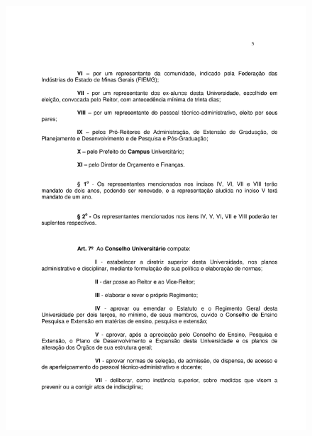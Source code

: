 \begin{figure}[p]
	\centering 
	\includegraphics[scale=0.7]{capitulos/resolucoes/cuni414/cuni414-5.pdf}
\end{figure}

